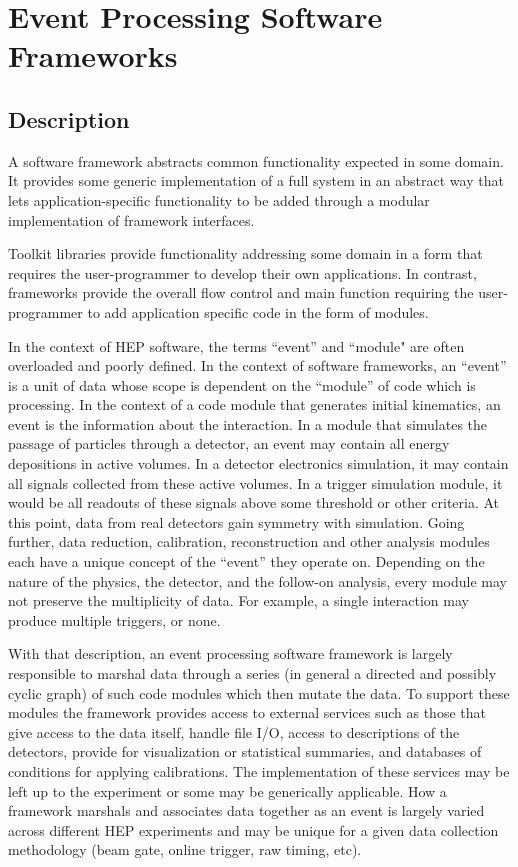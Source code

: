 \section{Event Processing Software Frameworks}

\subsection{Description}

A software framework abstracts common functionality expected in some
domain.  It provides some generic implementation of a full system in
an abstract way that lets application-specific functionality to be
added through a modular implementation of framework interfaces.

Toolkit libraries provide functionality addressing some domain in a
form that requires the user-programmer to develop their own
applications.  In contrast, frameworks provide the overall flow
control and main function requiring the user-programmer to add
application specific code in the form of modules.

In the context of HEP software, the terms ``event'' and ``module" are often overloaded and poorly defined.
In the context of software frameworks, an ``event'' is a unit of data whose scope is dependent
on the ``module'' of code which is processing.  In the context of a
code module that generates initial kinematics, an event is the
information about the interaction.  In a module that simulates the
passage of particles through a detector, an event may contain all
energy depositions in active volumes.  In a detector electronics
simulation, it may contain all signals collected from these active
volumes.  In a trigger simulation module, it would be all readouts of
these signals above some threshold or other criteria.  At this point,
data from real detectors gain symmetry with simulation.  Going further,
data reduction, calibration, reconstruction and other analysis modules
each have a unique concept of the ``event'' they operate on.
Depending on the nature of the physics, the detector, and the follow-on
analysis, every module may not preserve the multiplicity of data.  For
example, a single interaction may produce multiple triggers, or none.

With that description, an event processing software framework is
largely responsible to marshal data through a series (in general a
directed and possibly cyclic graph) of such code modules which then mutate the data.  To support
these modules the framework provides access to external services such
as those that give access to the data itself, handle file I/O, access
to descriptions of the detectors, provide for visualization or
statistical summaries, and databases of conditions for applying
calibrations. 
%
The implementation of these services may be left up to the experiment
or some may be generically applicable.
%
How a framework marshals and associates data together as an event is
largely varied across different HEP experiments and may be unique for
a given data collection methodology (beam gate, online trigger, raw
timing, etc).


